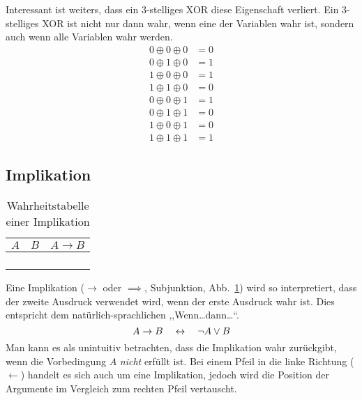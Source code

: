 Interessant ist weiters, dass ein 3-stelliges XOR diese Eigenschaft verliert. Ein 3-stelliges XOR ist nicht nur dann wahr, wenn eine der Variablen wahr ist, sondern auch wenn alle Variablen wahr werden.
%
\begin{align*}
  0 \oplus{} 0 \oplus{} 0 & = 0 \\
  0 \oplus{} 1 \oplus{} 0 & = 1 \\
  1 \oplus{} 0 \oplus{} 0 & = 1 \\
  1 \oplus{} 1 \oplus{} 0 & = 0 \\
  0 \oplus{} 0 \oplus{} 1 & = 1 \\
  0 \oplus{} 1 \oplus{} 1 & = 0 \\
  1 \oplus{} 0 \oplus{} 1 & = 0 \\
  1 \oplus{} 1 \oplus{} 1 & = 1
\end{align*}
%
\subsection{Implikation}
%
\begin{table}[ht]
 \begin{center}
  \begin{tabular}{cc|c}
   \hline
    $A$ & $B$ & $A \rightarrow{} B$ \\
   \hline \hline
    \F  & \F  & \T \\
    \F  & \T  & \T \\
    \T  & \F  & \F \\
    \T  & \T  & \T \\
  \end{tabular}
  \caption{Wahrheitstabelle einer Implikation}
  \label{fig:implication_operator}
 \end{center}
\end{table}
%
Eine Implikation ($\rightarrow$ oder $\implies$, Subjunktion, Abb.~\ref{fig:implication_operator}) wird so interpretiert, dass der zweite Ausdruck verwendet wird, wenn der erste Ausdruck wahr ist. Dies entspricht dem natürlich-sprachlichen ,,Wenn\dots dann\dots``.
\begin{equation}
  A \rightarrow B \quad\leftrightarrow\quad \neg A \lor B
\end{equation}
%
Man kann es als unintuitiv betrachten, dass die Implikation wahr zurückgibt, wenn die Vorbedingung $A$ \emph{nicht} erfüllt ist. Bei einem Pfeil in die linke Richtung ($\leftarrow$) handelt es sich auch um eine Implikation, jedoch wird die Position der Argumente im Vergleich zum rechten Pfeil vertauscht.

